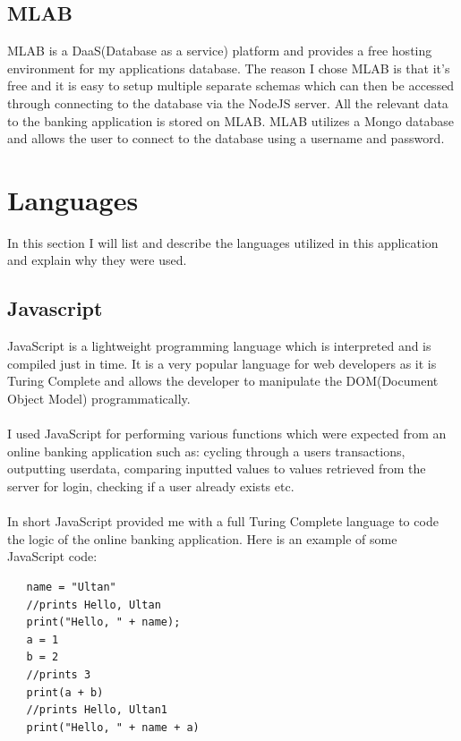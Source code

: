\subsection{MLAB}
MLAB is a DaaS(Database as a service) platform and provides a free hosting environment for my applications database\cite{MLAB}.  The reason I chose MLAB is that it's free and it is easy to setup multiple separate schemas which can then be accessed through connecting to the database via the NodeJS server.  All the relevant data to the banking application is stored on MLAB.  MLAB utilizes a Mongo database and allows the user to connect to the database using a username and password.


\section{Languages}
In this section I will list and describe the languages utilized in this application and explain why they were used.
\subsection{Javascript}
JavaScript is a lightweight programming language which is interpreted and is compiled just in time\cite{JavaScript}.  It is a very popular language for web developers as it is Turing Complete and allows the developer to manipulate the DOM(Document Object Model) programmatically.
\\
\\
 I used JavaScript for performing various functions which were expected from an online banking application such as: cycling through a users transactions, outputting userdata, comparing inputted values to values retrieved from the server for login, checking if a user already exists etc.
 \\
 \\
 In short JavaScript provided me with a full Turing Complete language to code the logic of the online banking application. Here is an example of some JavaScript code:
 \begin{verbatim}
   name = "Ultan"
   //prints Hello, Ultan
   print("Hello, " + name);
   a = 1
   b = 2
   //prints 3
   print(a + b)
   //prints Hello, Ultan1
   print("Hello, " + name + a)

 \end{verbatim}
